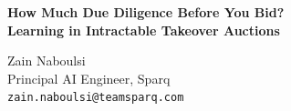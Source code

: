 \documentclass[11pt,a4paper]{article}
\begin{document}
\begin{center}
  {\LARGE\bfseries\color{sparqcoral}%
    How Much Due Diligence Before You Bid?\\[0.3em]
    Learning in Intractable Takeover Auctions\par}
  \vspace{1em}
  {\large Zain Naboulsi}\\[0.3em]
  Principal AI Engineer, Sparq\\[0.2em]
  \texttt{zain.naboulsi@teamsparq.com}
\end{center}

\vspace{0.8em}

\end{document}
